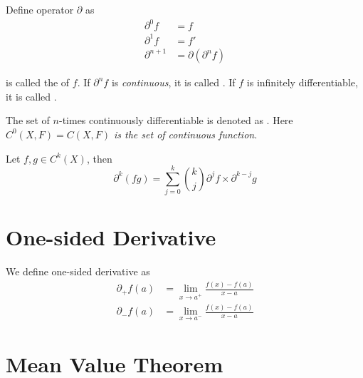 \begin{definition}
    Define operator $\partial$ as
    \begin{equation}
        \begin{aligned}
            \partial^0 f &= f\\
            \partial^1 f &= f'\\
            \partial^{n+1} &= \partial(\partial^n f)
        \end{aligned}
    \end{equation}
    
     is called the  of $f$. If $\partial^n f$ is \emph{continuous}, it is called . If $f$ is infinitely differentiable, it is called .
    
    The set of $n$-times continuously differentiable is denoted as . Here \emph{$C^0(X,F) = C(X,F)$ is the set of continuous function}.
\end{definition}


\begin{theorem}
    Let $f,g \in C^k (X)$, then
    \begin{equation}
        \partial^k (fg) = \sum_{j=0}^k {k \choose j} \partial^j f \times \partial^{k-j} g
    \end{equation}
\end{theorem}



\section{One-sided Derivative}

\begin{definition}
    We define one-sided derivative as
    \begin{equation}
        \begin{aligned}
            \partial_{+} f(a) &= \lim_{x \rightarrow a^{+}} \frac{f(x) - f(a)}{x - a} \\
            \partial_{-} f(a) &= \lim_{x \rightarrow a^{-}} \frac{f(x) - f(a)}{x - a} 
        \end{aligned}        
    \end{equation}
\end{definition}


\section{Mean Value Theorem}

